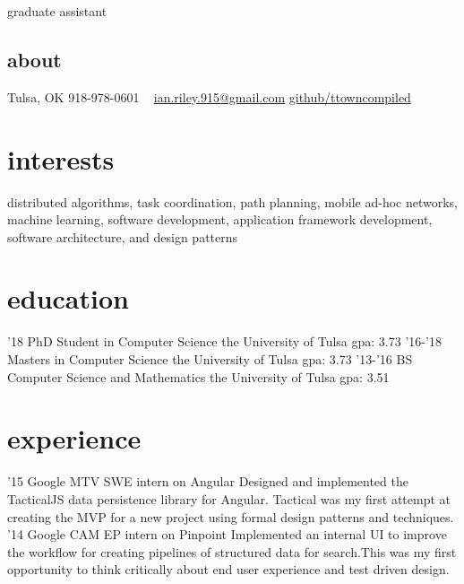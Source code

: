 \documentclass[print]{friggeri-cv}
\begin{document}
        {graduate assistant}


  \begin{aside}
    \section{about}
      Tulsa, OK
      918-978-0601
      ~
      \href{mailto:ian.riley.915@gmail.com}{ian.riley.915@gmail.com}
      \href{https://github.com/ttowncompiled}{github/ttowncompiled}
  \end{aside}

  \section{interests}
  distributed algorithms, task coordination, path planning, mobile ad-hoc networks, machine learning, software development, application framework development, software architecture, and design patterns

  \section{education}

    \begin{entrylist}
      \entry
        {'18}
        {PhD Student in Computer Science}
        {the University of Tulsa}
        {gpa: 3.73}
      \entry
        {'16-'18}
        {Masters in Computer Science}
        {the University of Tulsa}
        {gpa: 3.73}
      \entry
        {'13-'16}
        {BS Computer Science and Mathematics}
        {the University of Tulsa}
        {gpa: 3.51}
    \end{entrylist}

  \section{experience}

    \begin{entrylist}
      \entry
        {'15}
        {Google MTV}
        {SWE intern on Angular}
        {Designed and implemented the TacticalJS data persistence library for Angular. Tactical was my first attempt at creating the MVP for a new project using formal design patterns and techniques.}
      \entry
        {'14}
        {Google CAM}
        {EP intern on Pinpoint}
        {Implemented an internal UI to improve the workflow for creating pipelines of structured data for search.This was my first opportunity to think critically about end user experience and test driven design.}
    \end{entrylist}
  
\end{document}
